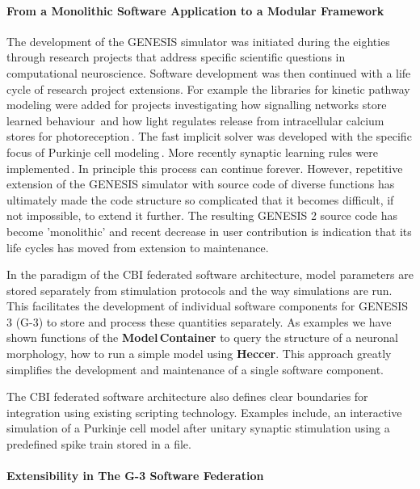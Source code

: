 \documentclass[12pt]{article}
\begin{document}
\paragraph{From a Monolithic Software Application to a Modular Framework}
The development of the GENESIS simulator was initiated during the
eighties through research projects that address specific scientific
questions in computational neuroscience.  Software development was
then continued with a life cycle of research project extensions.  For
example the libraries for kinetic pathway modeling were added for
projects investigating how signalling networks store learned
behaviour\,\cite{bhalla99:_emerg} and how light regulates release from
intracellular calcium stores for
photoreception\,\cite{blackwell00:_eviden_distin_light_induc_calcium}.
The fast implicit solver was developed with the specific focus of
Purkinje cell
modeling\,\cite{deschutter94:_purkin_i, deschutter94:_purkin_ii}.
More recently synaptic learning rules were
implemented\,\cite{guenay08:_chann_densit_distr_explain_spikin}.  In
principle this process can continue forever.  However, repetitive
extension of the GENESIS simulator with source code of diverse
functions has ultimately made the code structure so complicated that
it becomes difficult, if not impossible, to extend it further.  The
resulting GENESIS 2 source code has become 'monolithic' and recent
decrease in user contribution is indication that its life cycles has
moved from extension to maintenance.

In the paradigm of the CBI federated software architecture, model
parameters are stored separately from stimulation protocols and the
way simulations are run.  This facilitates the development of
individual software components for GENESIS 3 (G-3) to store and
process these quantities separately.  As examples we have shown
functions of the {\bf Model\,Container} to query the structure of a
neuronal morphology, how to run a simple model using {\bf Heccer}.
This approach greatly simplifies the development and maintenance of a
single software component.

The CBI federated software architecture also defines clear boundaries
for integration using existing scripting technology.  Examples include,
an interactive simulation of a Purkinje cell model after unitary
synaptic stimulation using a predefined spike train stored in a file.


\paragraph{Extensibility in The G-3 Software Federation}
\end{document}
